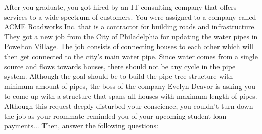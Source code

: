 \documentclass[addpoints,11pt,answers]{exam}
\begin{document}
\begin{questions}

\newpage 

\question After you graduate, you got hired by an IT consulting company that offers services to a wide spectrum of customers. You were assigned to a company called ACME Roadworks Inc. that is a contractor for building roads and infrastructure. They got a new job from the City of Philadelphia for updating the water pipes in Powelton Village. The job consists of connecting houses to each other which will then get connected to the city's main water pipe. Since water comes from a single source and flows towards houses, there should not be any cycle in the pipe system. Although the goal should be to build the pipe tree structure with minimum amount of pipes, the boss of the company Evelyn Deavor is asking you to come up with a structure that spans all houses with maximum length of pipes. Although this request deeply disturbed your conscience, you couldn't turn down the job as your roommate reminded you of your upcoming student loan payments... Then, answer the following questions:


\end{questions}
\end{document}
